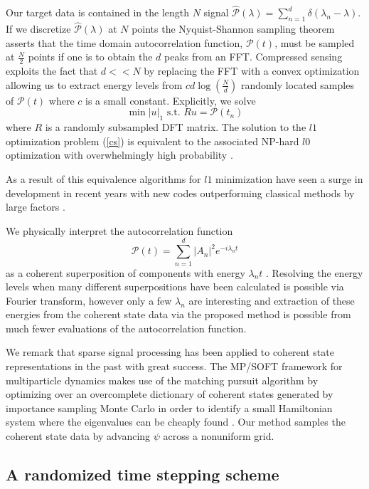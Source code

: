 \documentclass[11pt]{amsart}
\theoremstyle{remark}
\begin{document}
Our target data is contained in the length $N$ signal $\hat{\mathcal{P}}(\lambda) = \sum_{n=1}^d \delta(\lambda_n - \lambda)$. If we discretize $\hat{\mathcal{P}}(\lambda)$ at $N$ points the Nyquist-Shannon sampling theorem asserts that the time domain autocorrelation function, $\mathcal{P}(t)$, must be sampled at $\frac{N}{2}$ points if one is to obtain the $d$ peaks from an FFT. Compressed sensing exploits the fact that $d << N$ by replacing the FFT with a convex optimization allowing us to extract energy levels from $cd\log(\frac{N}{d})$ randomly located samples of $\mathcal{P}(t)$ where $c$ is a small constant. Explicitly, we solve
\begin{equation}\label{cs}
\min |u|_1 \text{ s.t. } Ru = \mathcal{P}(t_n)
\end{equation}
where $R$ is a randomly subsampled DFT matrix. The solution to the $l1$ optimization problem (\ref{cs}) is equivalent to the associated NP-hard $l0$ optimization with overwhelmingly high probability \cite{Candes2006}.

As a result of this equivalence algorithms for $l1$ minimization have seen a surge in development in recent years with new codes outperforming classical methods by large factors \cite{Goldstein}.

We physically interpret the autocorrelation function
\begin{equation}
\mathcal{P}(t) = \sum_{n=1}^d |A_n|^2 e^{-i\lambda_nt}
\end{equation}
as a coherent superposition of components with energy $\lambda_nt$ \cite{Chen1996}. Resolving the energy levels when many different superpositions have been calculated is possible via Fourier transform, however only a few $\lambda_n$ are interesting and extraction of these energies from the coherent state data via the proposed method is possible from much fewer evaluations of the autocorrelation function. 

We remark that sparse signal processing has been applied to coherent state representations in the past with great success. The MP/SOFT framework for multiparticle dynamics makes use of the matching pursuit algorithm \cite{Jie2008} by optimizing over an overcomplete dictionary of coherent states generated by importance sampling Monte Carlo in order to identify a small Hamiltonian system where the eigenvalues can be cheaply found \cite{Wu2003} \cite{Wu2004} \cite{Shalashilin2008}. Our method samples the coherent state data by advancing $\psi$ across a nonuniform grid.

\subsection{A randomized time stepping scheme}
\end{document}
